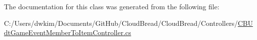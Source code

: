 The documentation for this class was generated from the following file\+:\begin{DoxyCompactItemize}
\item 
C\+:/\+Users/dwkim/\+Documents/\+Git\+Hub/\+Cloud\+Bread/\+Cloud\+Bread/\+Controllers/\hyperlink{_c_b_udt_game_event_member_to_item_controller_8cs}{C\+B\+Udt\+Game\+Event\+Member\+To\+Item\+Controller.\+cs}\end{DoxyCompactItemize}
